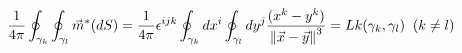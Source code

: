 \begin{equation}
\frac 1{4\pi }\oint_{\gamma _k}\oint_{\gamma _l}\vec{m}^{*}(dS)=\frac 1{4\pi 
}\epsilon ^{ijk}\oint_{\gamma _k}dx^i\oint_{\gamma _l}dy^j\frac{(x^k-y^k)}{%
\left\| \vec{x}-\vec{y}\right\| ^3}=Lk(\gamma _k,\gamma _l)\;\;(k\neq l)
\label{Gausslink}
\end{equation}

